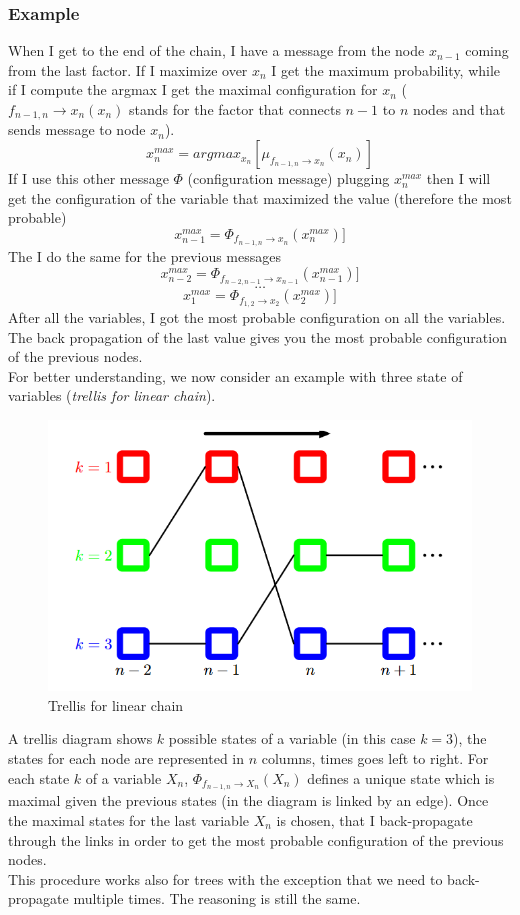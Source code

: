 \subsubsection{Example}
When I get to the end of the chain, I have a message from the node $x_{n-1}$
coming from the last factor. If I maximize over $x_{n}$ I get the maximum probability,
while if I compute the argmax I get the maximal configuration for $x_{n}$ (${f_{n-1, n}\rightarrow x_n}
(x_{n})$ stands for the factor that connects $n-1$ to $n$ nodes and that sends message
to node $x_{n}$).
\[
	x_{n}^{max}= argmax_{x_n}[\mu_{f_{n-1, n} \rightarrow x_n}(x_{n})]
\]
If I use this other message $\Phi$ (configuration message) plugging $x_{n}^{max}$
then I will get the configuration of the variable that maximized the value (therefore
the most probable)
\[
	x_{n-1}^{max}= \Phi_{f_{n-1, n} \rightarrow x_n}(x_{n}^{max})]
\]
The I do the same for the previous messages
\[
	x_{n-2}^{max}= \Phi_{f_{n-2, n-1} \rightarrow x_{n-1}}(x_{n-1}^{max})]
\]
\[
	\dots
\]
\[
	x_{1}^{max}= \Phi_{f_{1, 2} \rightarrow x_2}(x_{2}^{max})]
\]
After all the variables, I got the most probable configuration on all the
variables. The back propagation of the last value gives you the most probable configuration
of the previous nodes.\\ For better understanding, we now consider an example
with three state of variables (\textit{trellis for linear chain}).
\begin{figure}[H]
	\centering
	\includegraphics[scale=0.3]{images/09_BayesianNetworksInference_trellis.png}
	\caption{Trellis for linear chain}
	\label{fig:trellis}
\end{figure}
A trellis diagram shows $k$ possible states of a variable (in this case $k=3$), the
states for each node are represented in $n$ columns, times goes left to right. For
each state $k$ of a variable $X_{n}$, $\Phi_{f_{n-1, n} \rightarrow X_n}(X_{n})$
defines a unique state which is maximal given the previous states (in the diagram
is linked by an edge). Once the maximal states for the last variable $X_{n}$ is chosen,
that I back-propagate through the links in order to get the most probable
configuration of the previous nodes. \\ This procedure works also for trees with
the exception that we need to back-propagate multiple times. The reasoning is
still the same.

